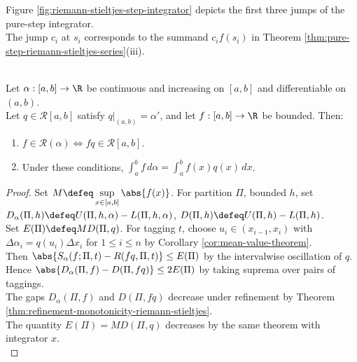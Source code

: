 \noindent Figure \ref{fig:riemann-stieltjes-step-integrator} depicts the first three jumps of the pure-step integrator.\\
The jump $c_i$ at $s_i$ corresponds to the summand $c_if(s_i)$ in Theorem \ref{thm:pure-step-riemann-stieltjes-series}(iii).
\begin{illustrationfigure}[H]
  \centering
  
  \caption{A pure-step integrator has jump $c_i$ at $s_i$; closed lower and open upper markers record $I(0)=0$.}
  \label{fig:riemann-stieltjes-step-integrator}
\end{illustrationfigure}

\begin{theorem} \label{thm:differentiable-integrator-reduces-to-riemann-integral} \\
Let $\alpha:[a,b]\to\R$ be continuous and increasing on $[a,b]$ and differentiable on $(a,b)$.\\
Let $q\in\mathcal{R}[a,b]$ satisfy $q|_{(a,b)}=\alpha'$, and let $f:[a,b]\to\R$ be bounded. Then:
\begin{enumerate}[label=(\roman*)]
\setlength{\itemsep}{0pt}
\item $f\in\mathcal{R}(\alpha)\Longleftrightarrow fq\in\mathcal{R}[a,b]$.
\item Under these conditions, $\int_a^b f\,d\alpha=\int_a^b f(x)q(x)\,dx$.
\end{enumerate}
\begin{proof}
Set $M\defeq\sup\limits_{x\in[a,b]}\abs{f(x)}$. For partition $\Pi$, bounded $h$, set $D_\alpha(\Pi,h)\defeq U(\Pi,h,\alpha)-L(\Pi,h,\alpha)$, $D(\Pi,h)\defeq U(\Pi,h)-L(\Pi,h)$.\\
Set $E(\Pi)\defeq MD(\Pi,q)$. For tagging $t$, choose $u_i\in(x_{i-1},x_i)$ with $\Delta\alpha_i=q(u_i)\Delta x_i$ for $1\leq i\leq n$ by Corollary \ref{cor:mean-value-theorem}.\\
Then $\abs{S_\alpha(f;\Pi,t)-R(fq,\Pi,t)}\leq E(\Pi)$ by the intervalwise oscillation of $q$.\\
Hence $\abs{D_\alpha(\Pi,f)-D(\Pi,fq)}\leq2E(\Pi)$ by taking suprema over pairs of taggings.\\
The gaps $D_\alpha(\Pi,f)$ and $D(\Pi,fq)$ decrease under refinement by Theorem \ref{thm:refinement-monotonicity-riemann-stieltjes}.\\
The quantity $E(\Pi)=MD(\Pi,q)$ decreases by the same theorem with integrator $x$.\\

\end{proof}
\end{theorem}
